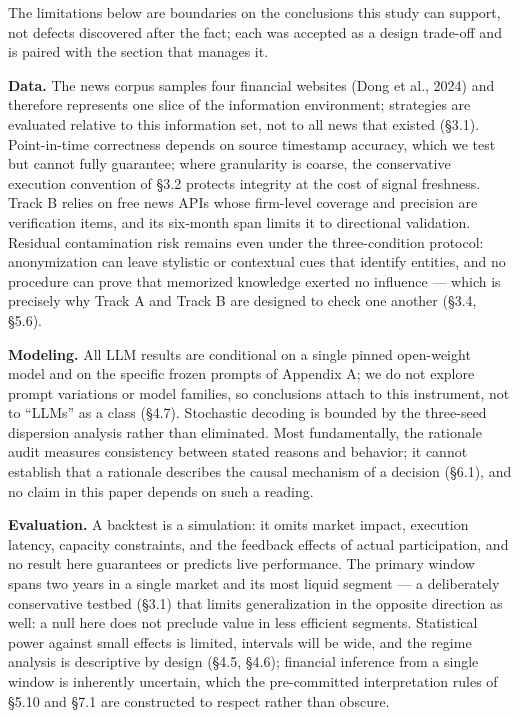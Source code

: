 \documentclass[
  12pt,
]{article}
\begin{document}
The limitations below are boundaries on the conclusions this study can
support, not defects discovered after the fact; each was accepted as a
design trade-off and is paired with the section that manages it.

\textbf{Data.} The news corpus samples four financial websites (Dong et
al., 2024) and therefore represents one slice of the information
environment; strategies are evaluated relative to this information set,
not to all news that existed (§3.1). Point-in-time correctness depends
on source timestamp accuracy, which we test but cannot fully guarantee;
where granularity is coarse, the conservative execution convention of
§3.2 protects integrity at the cost of signal freshness. Track B relies
on free news APIs whose firm-level coverage and precision are
verification items, and its six-month span limits it to directional
validation. Residual contamination risk remains even under the
three-condition protocol: anonymization can leave stylistic or
contextual cues that identify entities, and no procedure can prove that
memorized knowledge exerted no influence --- which is precisely why
Track A and Track B are designed to check one another (§3.4, §5.6).

\textbf{Modeling.} All LLM results are conditional on a single pinned
open-weight model and on the specific frozen prompts of Appendix A; we
do not explore prompt variations or model families, so conclusions
attach to this instrument, not to ``LLMs'' as a class (§4.7). Stochastic
decoding is bounded by the three-seed dispersion analysis rather than
eliminated. Most fundamentally, the rationale audit measures consistency
between stated reasons and behavior; it cannot establish that a
rationale describes the causal mechanism of a decision (§6.1), and no
claim in this paper depends on such a reading.

\textbf{Evaluation.} A backtest is a simulation: it omits market impact,
execution latency, capacity constraints, and the feedback effects of
actual participation, and no result here guarantees or predicts live
performance. The primary window spans two years in a single market and
its most liquid segment --- a deliberately conservative testbed (§3.1)
that limits generalization in the opposite direction as well: a null
here does not preclude value in less efficient segments. Statistical
power against small effects is limited, intervals will be wide, and the
regime analysis is descriptive by design (§4.5, §4.6); financial
inference from a single window is inherently uncertain, which the
pre-committed interpretation rules of §5.10 and §7.1 are constructed to
respect rather than obscure.
\end{document}
